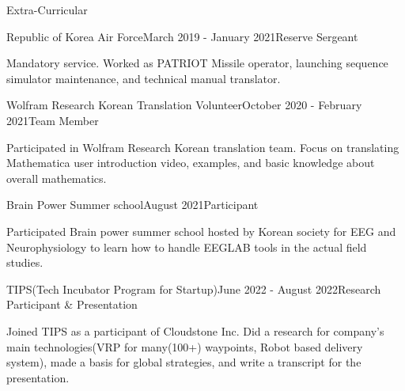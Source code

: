 \documentclass{resume} %
\begin{document}
\begin{rSection}{Extra-Curricular} \itemsep -3pt
\begin{rSubsection}{Republic of Korea Air Force}{March 2019 - January 2021}{Reserve Sergeant}{}
\item Mandatory service. Worked as PATRIOT Missile operator, launching sequence simulator maintenance, and technical manual translator.
\end{rSubsection}

\begin{rSubsection}{Wolfram Research Korean Translation Volunteer}{October 2020 - February 2021}{Team Member}{}
\item Participated in Wolfram Research Korean translation team. Focus on translating Mathematica user introduction video, examples, and basic knowledge about overall mathematics.
\end{rSubsection}

\begin{rSubsection}{Brain Power Summer school}{August 2021}{Participant}{}
\item Participated Brain power summer school hosted by Korean society for EEG and Neurophysiology to learn how to handle EEGLAB tools in the actual field studies.
\end{rSubsection}

\begin{rSubsection}{TIPS(Tech Incubator Program for Startup)}{June 2022 - August 2022}{Research Participant \& Presentation}{}
\item Joined TIPS as a participant of Cloudstone Inc. Did a research for company's main technologies(VRP for many(100+) waypoints, Robot based delivery system), made a basis for global strategies, and write a transcript for the presentation.
\end{rSubsection}

\end{rSection}
\end{document}
